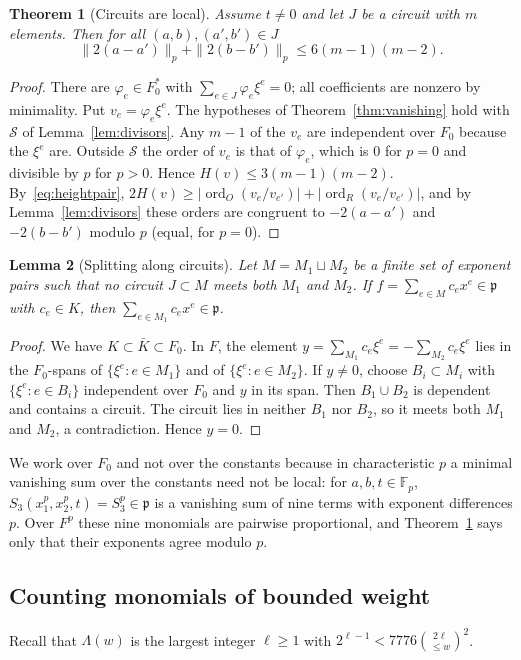 \documentclass[11pt]{article}
\newtheorem{theorem}{Theorem}
\newtheorem{lemma}[theorem]{Lemma}
\theoremstyle{definition}\newtheorem{definition}[theorem]{Definition}
\theoremstyle{remark}\newtheorem{remark}[theorem]{Remark}
\newcommand{\F}{\mathbb F}
\begin{document}
\begin{theorem}[Circuits are local]\label{thm:circuits}
Assume $t\ne0$ and let $J$ be a circuit with $m$ elements. Then for all
$(a,b),(a',b')\in J$
\[
 \|2(a-a')\|_p+\|2(b-b')\|_p\le6(m-1)(m-2).
\]
\end{theorem}
\begin{proof}
There are $\varphi_e\in F_0^*$ with $\sum_{e\in J}\varphi_e\xi^e=0$; all
coefficients are nonzero by minimality. Put $v_e=\varphi_e\xi^e$. The
hypotheses of Theorem~\ref{thm:vanishing} hold with $\mathcal S$ of
Lemma~\ref{lem:divisors}. Any $m-1$ of the $v_e$ are independent over
$F_0$ because the $\xi^e$ are. Outside $\mathcal S$ the order of $v_e$ is
that of $\varphi_e$, which is $0$ for $p=0$ and divisible by $p$ for
$p>0$. Hence $H(v)\le3(m-1)(m-2)$. By~\eqref{eq:heightpair},
$2H(v)\ge|\operatorname{ord}_O(v_e/v_{e'})|
+|\operatorname{ord}_R(v_e/v_{e'})|$, and by Lemma~\ref{lem:divisors}
these orders are congruent to $-2(a-a')$ and $-2(b-b')$ modulo $p$
(equal, for $p=0$).
\end{proof}

\begin{lemma}[Splitting along circuits]\label{lem:circuitsplit}
Let $M=M_1\sqcup M_2$ be a finite set of exponent pairs such that no
circuit $J\subset M$ meets both $M_1$ and $M_2$. If
$f=\sum_{e\in M}c_ex^e\in\mathfrak p$ with $c_e\in K$, then
$\sum_{e\in M_1}c_ex^e\in\mathfrak p$.
\end{lemma}
\begin{proof}
We have $K\subset\bar K\subset F_0$. In $F$, the element
$y=\sum_{M_1}c_e\xi^e=-\sum_{M_2}c_e\xi^e$ lies in the $F_0$-spans of
$\{\xi^e:e\in M_1\}$ and of $\{\xi^e:e\in M_2\}$. If $y\ne0$, choose
$B_i\subset M_i$ with $\{\xi^e:e\in B_i\}$ independent over $F_0$ and $y$
in its span. Then $B_1\cup B_2$ is dependent and contains a circuit. The
circuit lies in neither $B_1$ nor $B_2$, so it meets both $M_1$ and $M_2$,
a contradiction. Hence $y=0$.
\end{proof}

We work over $F_0$ and not over the constants because in characteristic
$p$ a minimal vanishing sum over the constants need not be local: for
$a,b,t\in\F_p$, $S_3(x_1^p,x_2^p,t)=S_3^p\in\mathfrak p$ is a vanishing sum
of nine terms with exponent differences $p$. Over $F^p$ these nine
monomials are pairwise proportional, and Theorem~\ref{thm:circuits} says
only that their exponents agree modulo $p$.

\subsection{Counting monomials of bounded weight}\label{app:growthcount}
Recall that $\Lambda(w)$ is the largest integer $\ell\ge1$ with
$2^{\ell-1}<7776\binom{2\ell}{\le w}^2$.
\end{document}
